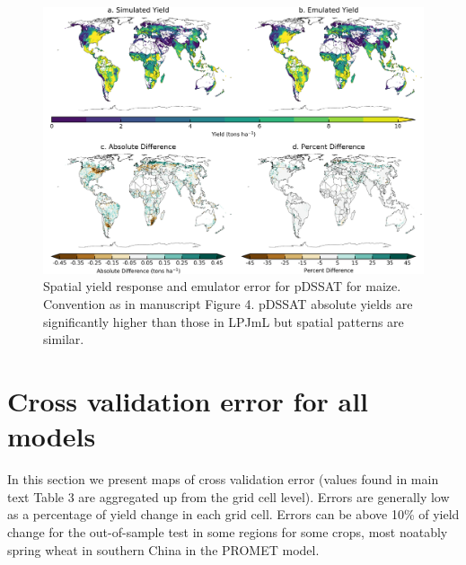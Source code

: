\documentclass[12pt]{article}
\begin{document}
\begin{figure}[h!]
  \includegraphics[width=\textwidth]{pdssat_maize.png}
  \caption{Spatial yield response and emulator error for pDSSAT for maize. Convention as in manuscript Figure 4. pDSSAT absolute yields are significantly higher than those in LPJmL but spatial patterns are similar.}
  \label{fig:lpjmlrice}
\end{figure}

\clearpage
\section{Cross validation error for all models}
\begin{flushleft}
In this section we present maps of cross validation error (values found in main text Table 3 are aggregated up from the grid cell level). Errors are generally low as a percentage of yield change in each grid cell. Errors can be above 10\% of yield change for the out-of-sample test in some regions for some crops, most noatably spring wheat in southern China in the PROMET model.
\end{flushleft}
\end{document}
